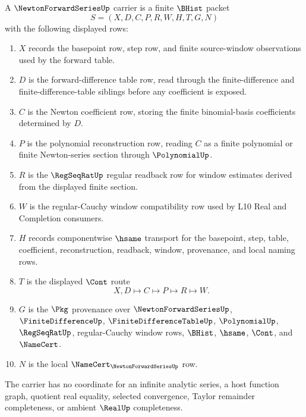 \begin{definition}
\label{def:newton-forward-series-carrier}
A $\NewtonForwardSeriesUp$ carrier is a finite $\BHist$ packet
$$
S=(X,D,C,P,R,W,H,T,G,N)
$$
with the following displayed rows:
\begin{enumerate}
\item $X$ records the basepoint row, step row, and finite source-window observations used by the forward table.
\item $D$ is the forward-difference table row, read through the finite-difference and finite-difference-table siblings before any coefficient is exposed.
\item $C$ is the Newton coefficient row, storing the finite binomial-basis coefficients determined by $D$.
\item $P$ is the polynomial reconstruction row, reading $C$ as a finite polynomial or finite Newton-series section through $\PolynomialUp$.
\item $R$ is the $\RegSeqRatUp$ regular readback row for window estimates derived from the displayed finite section.
\item $W$ is the regular-Cauchy window compatibility row used by L10 Real and Completion consumers.
\item $H$ records componentwise $\hsame$ transport for the basepoint, step, table, coefficient, reconstruction, readback, window, provenance, and local naming rows.
\item $T$ is the displayed $\Cont$ route
$$
X,D \longmapsto C \longmapsto P \longmapsto R \longmapsto W .
$$
\item $G$ is the $\Pkg$ provenance over $\NewtonForwardSeriesUp$, $\FiniteDifferenceUp$, $\FiniteDifferenceTableUp$, $\PolynomialUp$, $\RegSeqRatUp$, regular-Cauchy window rows, $\BHist$, $\hsame$, $\Cont$, and $\NameCert$.
\item $N$ is the local $\NameCert_{\NewtonForwardSeriesUp}$ row.
\end{enumerate}
The carrier has no coordinate for an infinite analytic series, a host function graph, quotient real equality, selected convergence, Taylor remainder completeness, or ambient $\RealUp$ completeness.
\end{definition}

